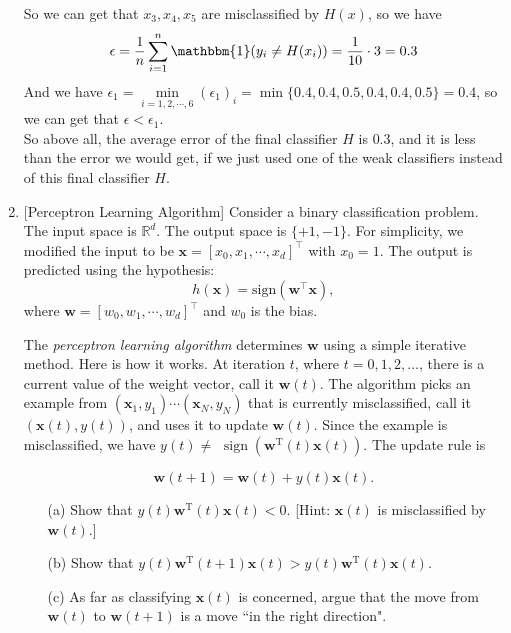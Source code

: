 \documentclass[10pt]{article}
\begin{document}
\begin{enumerate}[1.]
So we can get that $x_3, x_4, x_5$ are misclassified by $H(x)$, so we have
$$\epsilon=\dfrac{1}{n}\sum_{i=1}^n\mathbbm{1}(y_i\neq H(x_i))=\dfrac{1}{10}\cdot 3=0.3$$
And we have $\epsilon_1=\min\limits_{i=1,2,\cdots,6}(\epsilon_1)_i=\min\{0.4, 0.4, 0.5, 0.4, 0.4, 0.5\}=0.4$,
so we can get that $\epsilon<\epsilon_1$.\\

So above all, the average error of the final classifier $H$ is $0.3$, and it is less than the error we would get, if we just used one of the weak classifiers instead of this final classifier $H$.\\
        
\newpage

	\item {} [Perceptron Learning Algorithm]
            Consider a binary classification problem. The input space is $\mathbb{R}^{d}$. The output space is $\{ +1, -1 \}$. For simplicity, we modified the input to be $\mathbf{x} = [x_0, x_1, \cdots, x_d]^{\intercal}$ with $x_0=1$. The output is predicted using the hypothesis:
            \begin{equation}
                h(\mathbf{x}) = \text{sign}(\mathbf{w}^{\intercal}\mathbf{x}),
            \end{equation}
            where $\mathbf{w} = [w_0, w_1, \cdots, w_d]^{\intercal}$ and $w_0$ is the bias.
            
            The \textit{perceptron learning algorithm} determines $\mathbf{w}$ using a simple iterative method. Here is how it works. At iteration $t$, where $t=0,1,2, \ldots$, there is a current value of the weight vector, call it $\mathbf{w}(t)$. The algorithm picks an example from $\left(\mathbf{x}_1, y_1\right) \cdots\left(\mathbf{x}_N, y_N\right)$ that is currently misclassified, call it $(\mathbf{x}(t), y(t))$, and uses it to update $\mathbf{w}(t)$. Since the example is misclassified, we have $y(t) \neq$ $\operatorname{sign}\left(\mathbf{w}^{\mathrm{T}}(t) \mathbf{x}(t)\right)$. The update rule is

            \begin{equation}
                \mathbf{w}(t+1)=\mathbf{w}(t)+y(t) \mathbf{x}(t).    
            \end{equation}

                
		\begin{itemize}
			\item[(a)] Show that $y(t) \mathbf{w}^{\mathrm{T}}(t) \mathbf{x}(t)<0$. [Hint: $\mathbf{x}(t)$ is misclassified by $\mathbf{w}(t)$.]~ 
			\item[(b)] Show that $y(t) \mathbf{w}^{\mathrm{T}}(t+1) \mathbf{x}(t)>y(t) \mathbf{w}^{\mathrm{T}}(t) \mathbf{x}(t)$.~ 
			\item[(c)]   As far as classifying $\mathbf{x}(t)$ is concerned, argue that the move from $\mathbf{w}(t)$ to $\mathbf{w}(t+1)$ is a move ``in the right direction".~ 
		\end{itemize}


\end{enumerate}
\end{document}
